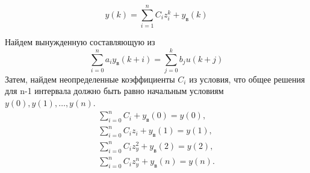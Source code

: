 \begin{equation}
    y(k) = \sum\limits_{i=1}^{n} C_i z_i^k + y_{\text{в}}(k)
\end{equation}

Найдем вынужденную составляющую из
\begin{equation}
    \sum\limits_{i=0}^{n} a_i y_{\text{в}}(k+i) = \sum\limits_{j=0}^{k} b_j u(k+j)
\end{equation}
Затем, найдем неопределенные коэффициенты $C_i$ из условия, что общее решения для n-1 интервала должно быть равно начальным условиям $y(0),y(1), \dots, y(n)$.
\begin{gather}
    \sum\limits_{i=0}^{n} C_i +  y_{\text{в}}(0) = y(0),\\
    \sum\limits_{i=0}^{n} C_i z_i+  y_{\text{в}}(1) = y(1),\\
    \sum\limits_{i=0}^{n} C_i z_y^2+  y_{\text{в}}(2) = y(2),\\
    \sum\limits_{i=0}^{n} C_i z_y^n +  y_{\text{в}}(n) = y(n).
\end{gather}


